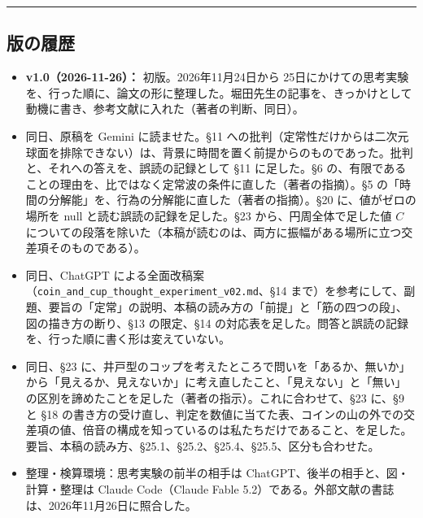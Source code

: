\documentclass[
  a4paper,
]{ltjsarticle}
\providecommand{\tightlist}{%
  \setlength{\itemsep}{0pt}\setlength{\parskip}{0pt}}
\begin{document}
\begin{center}\rule{0.5\linewidth}{0.5pt}\end{center}

\subsection{版の履歴}\label{ux7248ux306eux5c65ux6b74}

\begin{itemize}
\tightlist
\item
  \textbf{v1.0（2026-11-26）：} 初版。2026年11月24日から
  25日にかけての思考実験を、行った順に、論文の形に整理した。堀田先生の記事を、きっかけとして動機に書き、参考文献に入れた（著者の判断、同日）。
\item
  同日、原稿を Gemini に読ませた。§11
  への批判（定常性だけからは二次元球面を排除できない）は、背景に時間を置く前提からのものであった。批判と、それへの答えを、誤読の記録として
  §11 に足した。§6
  の、有限であることの理由を、比ではなく定常波の条件に直した（著者の指摘）。§5
  の「時間の分解能」を、行為の分解能に直した（著者の指摘）。§20
  に、値がゼロの場所を null と読む誤読の記録を足した。§23
  から、円周全体で足した値 \(C\)
  についての段落を除いた（本稿が読むのは、両方に振幅がある場所に立つ交差項そのものである）。
\item
  同日、ChatGPT
  による全面改稿案（\texttt{coin\_\allowbreak{}and\_\allowbreak{}cup\_\allowbreak{}thought\_\allowbreak{}experiment\_\allowbreak{}v02.md}、§14
  まで）を参考にして、副題、要旨の「定常」の説明、本稿の読み方の「前提」と「筋の四つの段」、図の描き方の断り、§13
  の限定、§14
  の対応表を足した。問答と誤読の記録を、行った順に書く形は変えていない。
\item
  同日、§23
  に、井戸型のコップを考えたところで問いを「あるか、無いか」から「見えるか、見えないか」に考え直したこと、「見えない」と「無い」の区別を諦めたことを足した（著者の指示）。これに合わせて、§23
  に、§9 と §18
  の書き方の受け直し、判定を数値に当てた表、コインの山の外での交差項の値、倍音の構成を知っているのは私たちだけであること、を足した。要旨、本稿の読み方、§25.1、§25.2、§25.4、§25.5、区分も合わせた。
\item
  整理・検算環境：思考実験の前半の相手は
  ChatGPT、後半の相手と、図・計算・整理は Claude Code（Claude Fable
  5.2）である。外部文献の書誌は、2026年11月26日に照合した。
\end{itemize}
\end{document}
